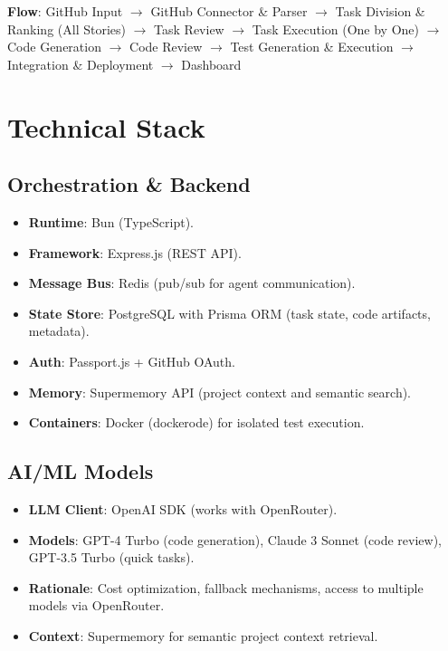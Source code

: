\documentclass[11pt,a4paper]{article}
\begin{document}
\vspace*{-0.2cm}
\noindent\textbf{Flow}: GitHub Input $\rightarrow$ GitHub Connector \& Parser $\rightarrow$ Task Division \& Ranking (All Stories) $\rightarrow$ Task Review $\rightarrow$ Task Execution (One by One) $\rightarrow$ Code Generation $\rightarrow$ Code Review $\rightarrow$ Test Generation \& Execution $\rightarrow$ Integration \& Deployment $\rightarrow$ Dashboard

\section{Technical Stack}

\subsection{Orchestration \& Backend}

\begin{itemize}
  \item \textbf{Runtime}: Bun (TypeScript).
  \item \textbf{Framework}: Express.js (REST API).
  \item \textbf{Message Bus}: Redis (pub/sub for agent communication).
  \item \textbf{State Store}: PostgreSQL with Prisma ORM (task state, code artifacts, metadata).
  \item \textbf{Auth}: Passport.js + GitHub OAuth.
  \item \textbf{Memory}: Supermemory API (project context and semantic search).
  \item \textbf{Containers}: Docker (dockerode) for isolated test execution.
\end{itemize}

\subsection{AI/ML Models}

\begin{itemize}
  \item \textbf{LLM Client}: OpenAI SDK (works with OpenRouter).
  \item \textbf{Models}: GPT-4 Turbo (code generation), Claude 3 Sonnet (code review), GPT-3.5 Turbo (quick tasks).
  \item \textbf{Rationale}: Cost optimization, fallback mechanisms, access to multiple models via OpenRouter.
  \item \textbf{Context}: Supermemory for semantic project context retrieval.
\end{itemize}
\end{document}
